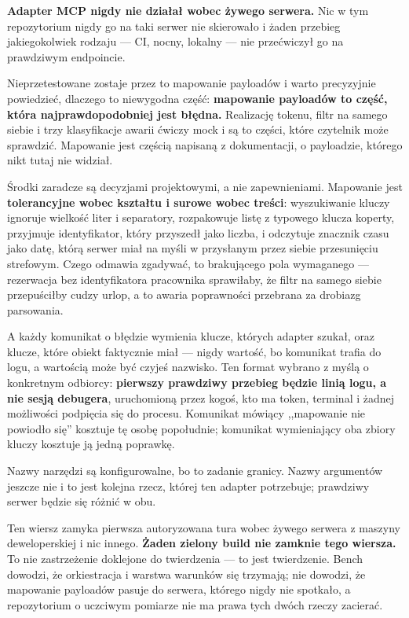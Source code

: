 \documentclass[11pt,a4paper]{article}
\newcommand{\finding}[1]{{\color{primaryblue}\textbf{#1}}}
\begin{document}
\textbf{Adapter MCP nigdy nie działał wobec żywego serwera.} Nic w tym repozytorium nigdy go na taki serwer nie skierowało i żaden przebieg jakiegokolwiek rodzaju --- CI, nocny, lokalny --- nie przećwiczył go na prawdziwym endpoincie.

Nieprzetestowane zostaje przez to mapowanie payloadów i warto precyzyjnie powiedzieć, dlaczego to niewygodna część: \finding{mapowanie payloadów to część, która najprawdopodobniej jest błędna.} Realizację tokenu, filtr na samego siebie i trzy klasyfikacje awarii ćwiczy mock i są to części, które czytelnik może sprawdzić. Mapowanie jest częścią napisaną z dokumentacji, o payloadzie, którego nikt tutaj nie widział.

Środki zaradcze są decyzjami projektowymi, a nie zapewnieniami. Mapowanie jest \textbf{tolerancyjne wobec kształtu i surowe wobec treści}: wyszukiwanie kluczy ignoruje wielkość liter i separatory, rozpakowuje listę z typowego klucza koperty, przyjmuje identyfikator, który przyszedł jako liczba, i odczytuje znacznik czasu jako datę, którą serwer miał na myśli w przysłanym przez siebie przesunięciu strefowym. Czego odmawia zgadywać, to brakującego pola wymaganego --- rezerwacja bez identyfikatora pracownika sprawiłaby, że filtr na samego siebie przepuściłby cudzy urlop, a to awaria poprawności przebrana za drobiazg parsowania.

A każdy komunikat o błędzie wymienia klucze, których adapter szukał, oraz klucze, które obiekt faktycznie miał --- nigdy wartość, bo komunikat trafia do logu, a wartością może być czyjeś nazwisko. Ten format wybrano z myślą o konkretnym odbiorcy: \textbf{pierwszy prawdziwy przebieg będzie linią logu, a nie sesją debugera}, uruchomioną przez kogoś, kto ma token, terminal i żadnej możliwości podpięcia się do procesu. Komunikat mówiący ,,mapowanie nie powiodło się'' kosztuje tę osobę popołudnie; komunikat wymieniający oba zbiory kluczy kosztuje ją jedną poprawkę.

Nazwy narzędzi są konfigurowalne, bo to zadanie granicy. Nazwy argumentów jeszcze nie i to jest kolejna rzecz, której ten adapter potrzebuje; prawdziwy serwer będzie się różnić w obu.

Ten wiersz zamyka pierwsza autoryzowana tura wobec żywego serwera z maszyny deweloperskiej i nic innego. \finding{Żaden zielony build nie zamknie tego wiersza.} To nie zastrzeżenie doklejone do twierdzenia --- to jest twierdzenie. Bench dowodzi, że orkiestracja i warstwa warunków się trzymają; nie dowodzi, że mapowanie payloadów pasuje do serwera, którego nigdy nie spotkało, a repozytorium o uczciwym pomiarze nie ma prawa tych dwóch rzeczy zacierać.
\end{document}
